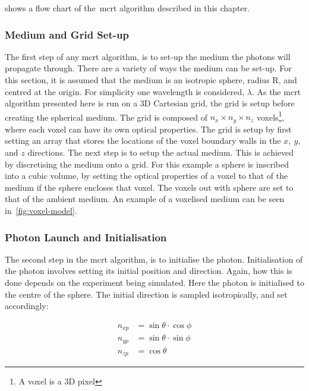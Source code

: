  shows a flow chart of the~\gls*{mcrt} algorithm described in this chapter.


\subsubsection*{Medium and Grid Set-up}\label{sec:algomedium}
The first step of any \gls*{mcrt} algorithm, is to set-up the medium the photons will propagate through. There are a variety of ways the medium can be set-up. For this section, it is assumed that the medium is an isotropic sphere, radius R, and centred at the origin. For simplicity one wavelength is considered, $\lambda$. As the \gls*{mcrt} algorithm presented here is run on a 3D Cartesian grid, the grid is setup before creating the spherical medium. The grid is composed of $n_x \times n_y \times n_z$ voxels\footnote{A voxel is a 3D pixel}, where each voxel can have its own optical properties.
The grid is setup by first setting an array that stores the locations of the voxel boundary walls in the $x,\ y$, and $z$ directions. 
The next step is to setup the actual medium. This is achieved by discretising the medium onto a grid. 
For this example a sphere is inscribed into a cubic volume, by setting the optical properties of a voxel to that of the medium if the sphere encloses that voxel. The voxels out with sphere are set to that of the ambient medium. An example of a voxelised medium can be seen in~\cref{fig:voxel-model}. 



\subsubsection*{Photon Launch and Initialisation}\label{sec:photlaunch}

The second step in the \gls*{mcrt} algorithm, is to initialise the photon. Initialisation of the photon involves setting its initial position and direction. Again, how this is done depends on the experiment being simulated. Here the photon is initialised to the centre of the sphere. The initial direction is sampled isotropically, and set accordingly:

\begin{align}
n_{xp}&=\sin\theta \cdot \cos\phi \label{eqn:dirvec1}\\
n_{yp}&=\sin\theta \cdot \sin\phi \label{eqn:dirvec2}\\
n_{zp}&=\cos\theta \label{eqn:dirvec3}
\end{align}


